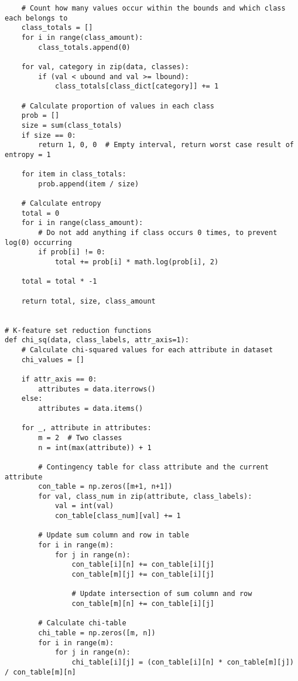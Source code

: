 \documentclass[11pt, a4paper]{article}
\begin{document}
\begin{verbatim}
    # Count how many values occur within the bounds and which class each belongs to
    class_totals = []
    for i in range(class_amount):
        class_totals.append(0)
               
    for val, category in zip(data, classes):
        if (val < ubound and val >= lbound):
            class_totals[class_dict[category]] += 1
    
    # Calculate proportion of values in each class
    prob = []
    size = sum(class_totals)
    if size == 0:
        return 1, 0, 0  # Empty interval, return worst case result of entropy = 1

    for item in class_totals:
        prob.append(item / size)

    # Calculate entropy
    total = 0
    for i in range(class_amount):
        # Do not add anything if class occurs 0 times, to prevent log(0) occurring
        if prob[i] != 0:
            total += prob[i] * math.log(prob[i], 2)
        
    total = total * -1

    return total, size, class_amount


# K-feature set reduction functions
def chi_sq(data, class_labels, attr_axis=1):
    # Calculate chi-squared values for each attribute in dataset
    chi_values = []
    
    if attr_axis == 0:
        attributes = data.iterrows()
    else:
        attributes = data.items()
    
    for _, attribute in attributes:
        m = 2  # Two classes
        n = int(max(attribute)) + 1

        # Contingency table for class attribute and the current attribute
        con_table = np.zeros([m+1, n+1])
        for val, class_num in zip(attribute, class_labels):
            val = int(val)
            con_table[class_num][val] += 1

        # Update sum column and row in table
        for i in range(m):
            for j in range(n):
                con_table[i][n] += con_table[i][j]
                con_table[m][j] += con_table[i][j]

                # Update intersection of sum column and row
                con_table[m][n] += con_table[i][j]

        # Calculate chi-table
        chi_table = np.zeros([m, n])
        for i in range(m):
            for j in range(n):
                chi_table[i][j] = (con_table[i][n] * con_table[m][j]) / con_table[m][n]


\end{verbatim}
\end{document}
